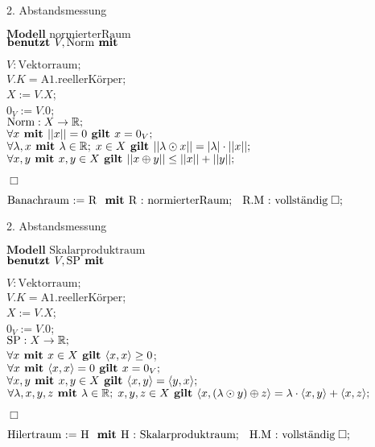 \documentclass{article}
\begin{document}
\begin{flashcard}{2. Abstandsmessung}



\backside

$\textbf{Modell } \text{normierterRaum}$ \\
  $\textbf{benutzt } V,\text{Norm} \textbf{ \textup{mit} \allowbreak}$
  \begin{tabulator}
    $V : \text{Vektorraum};$ \\
    $V.K = \text{A1.reellerKörper}$; \\
    $X := V.X$; \\
    $0_{V} := V.0$; \\
    $\text{Norm} : X \rightarrow \mathbb{R};$ \\
    $\forall x \textbf{ \textup{mit} \allowbreak} ||x|| = 0 \textbf{ \textup{gilt} \allowbreak} x = 0_{V};$ \\
    $\forall \lambda,x \textbf{ \textup{mit} \allowbreak} \lambda \in \mathbb{R}; \; x \in X \textbf{ \textup{gilt} \allowbreak} ||\lambda \odot
    x|| = |\lambda| \cdot ||x||;$ \\
    $\forall x,y \textbf{ \textup{mit} \allowbreak} x,y \in X \textbf{ \textup{gilt} \allowbreak} ||x \oplus y|| \leq ||x|| + ||y||;$
    \end{tabulator}
  $\Box$

  $\text{Banachraum := R \textbf{ \textup{mit} \allowbreak}R : normierterRaum; \; R.M : \text{vollständig}}
  \; \Box;$


\end{flashcard}


\begin{flashcard}[]{2. Abstandsmessung}

\backside

$\textbf{Modell } \text{Skalarproduktraum}$ \\
  $\textbf{benutzt } V,\text{SP} \textbf{ \textup{mit} \allowbreak}$
  \begin{tabulator}
    $V : \text{Vektorraum};$ \\
    $V.K = \text{A1.reellerKörper}$; \\
    $X := V.X$; \\
    $0_{V} := V.0$; \\
    $\text{SP} : X \rightarrow \mathbb{R};$ \\
    $\forall x \textbf{ \textup{mit} \allowbreak} x \in X \textbf{ \textup{gilt} \allowbreak} \langle x,x \rangle \geq 0$; \\
    $\forall x \textbf{ \textup{mit} \allowbreak} \langle x,x \rangle = 0 \textbf{ \textup{gilt} \allowbreak} x = 0_{V};$ \\
    $\forall x,y \textbf{ \textup{mit} \allowbreak} x,y \in X \textbf{ \textup{gilt} \allowbreak} \langle x,y \rangle = \langle y,x \rangle;$ \\
    $\forall \lambda,x,y,z \textbf{ \textup{mit} \allowbreak} \lambda \in \mathbb{R}; \; x,y,z \in X \textbf{ \textup{gilt} \allowbreak} \langle
    x,(\lambda \odot y) \oplus z \rangle = \lambda \cdot \langle x,y \rangle +
    \langle x,z \rangle;$
    \end{tabulator}
  $\Box$

  $\text{Hilertraum := H \textbf{ \textup{mit} \allowbreak}H : Skalarproduktraum; \; H.M : \text{vollständig}}
  \; \Box;$


\end{flashcard}
\end{document}
